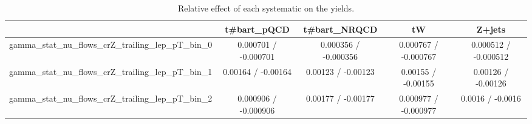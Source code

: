 \documentclass[10pt]{article}
\begin{document}
\begin{table}[htbp]
\begin{center}
\begin{tabular}{|c|c|c|c|c|}
\hline 
      & t#bar{t}_{pQCD}      & t#bar{t}_{NRQCD}      & tW      & Z+jets \\ 
\hline 
  gamma_stat_nu_flows_crZ_trailing_lep_pT_bin_0 & 0.000701 / -0.000701 & 0.000356 / -0.000356 & 0.000767 / -0.000767 & 0.000512 / -0.000512 \\ 
  gamma_stat_nu_flows_crZ_trailing_lep_pT_bin_1 & 0.00164 / -0.00164 & 0.00123 / -0.00123 & 0.00155 / -0.00155 & 0.00126 / -0.00126 \\ 
  gamma_stat_nu_flows_crZ_trailing_lep_pT_bin_2 & 0.000906 / -0.000906 & 0.00177 / -0.00177 & 0.000977 / -0.000977 & 0.0016 / -0.0016 \\ 
\hline 
\end{tabular} 
\caption{Relative effect of each systematic on the yields.} 
\end{center} 
\end{table} 
\end{document}

